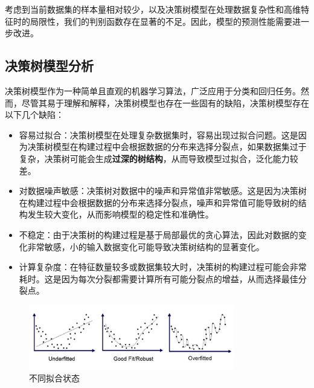 考虑到当前数据集的样本量相对较少，以及决策树模型在处理数据复杂性和高维特征时的局限性，我们的判别函数存在显著的不足。因此，模型的预测性能需要进一步改进。
\vspace*{1cm}

\subsection{决策树模型分析}
决策树模型作为一种简单且直观的机器学习算法，广泛应用于分类和回归任务。然而，尽管其易于理解和解释，决策树模型也存在一些固有的缺陷，决策树模型存在以下几个缺陷：
\begin{itemize}
	\item 容易过拟合：决策树模型在处理复杂数据集时，容易出现过拟合问题。这是因为决策树模型在构建过程中会根据数据的分布来选择分裂点，如果数据集过于复杂，决策树可能会生成\textbf{过深的树结构}，从而导致模型过拟合，泛化能力较差。

	\item 对数据噪声敏感：决策树对数据中的噪声和异常值非常敏感。这是因为决策树在构建过程中会根据数据的分布来选择分裂点，噪声和异常值可能导致树的结构发生较大变化，从而影响模型的稳定性和准确性。
	\item 不稳定：由于决策树的构建过程是基于局部最优的贪心算法，因此对数据的变化非常敏感，小的输入数据变化可能导致决策树结构的显著变化。
	\item 计算复杂度：在特征数量较多或数据集较大时，决策树的构建过程可能会非常耗时。这是因为每次分裂都需要计算所有可能分裂点的增益，从而选择最佳分裂点。
\end{itemize}
\begin{figure}[H]
	\centering
	\includegraphics[width=0.8\textwidth]{figures/fit_status.png}
	\caption{不同拟合状态}
	\label{fig:fit_status}
\end{figure}

